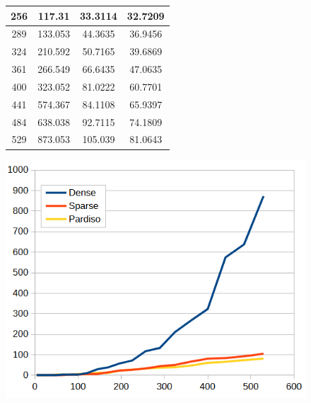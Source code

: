 \documentclass[letterpaper, 10 pt, conference]{ieeeconf}  %
\begin{document}
\begin{figure}
\begin{minipage}[b]{.45\linewidth}
\begin{center}
\begin{tabular}{|c|c|c|c|}
                        256               & 117.31         & 33.3114         & 32.7209          \\ \hline
                        289               & 133.053        & 44.3635         & 36.9456          \\ \hline
                        324               & 210.592        & 50.7165         & 39.6869          \\ \hline
                        361               & 266.549        & 66.6435         & 47.0635          \\ \hline
                        400               & 323.052        & 81.0222         & 60.7701          \\ \hline
                        441               & 574.367        & 84.1108         & 65.9397          \\ \hline
                        484               & 638.038        & 92.7115         & 74.1809          \\ \hline
                        529               & 873.053        & 105.039         & 81.0643          \\ \hline
                        \end{tabular}
                \end{center}
                 \label{fig:frametimes}
        \end{minipage}\hfill
        \begin{minipage}[b]{.45\linewidth}
                \centering
                \includegraphics[width=1.0\linewidth]{frametimes.PNG}
                 \label{fig:frametimesgraph}
        \end{minipage}
\end{figure}
\end{document}
